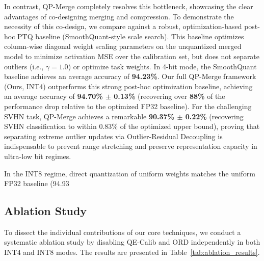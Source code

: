 In contrast, QP-Merge completely resolves this bottleneck, showcasing the clear advantages of co-designing merging and compression. To demonstrate the necessity of this co-design, we compare against a robust, optimization-based post-hoc PTQ baseline (SmoothQuant-style scale search). This baseline optimizes column-wise diagonal weight scaling parameters on the unquantized merged model to minimize activation MSE over the calibration set, but does not separate outliers (i.e., $\gamma = 1.0$) or optimize task weights. In 4-bit mode, the SmoothQuant baseline achieves an average accuracy of \textbf{94.23\%}. Our full QP-Merge framework (Ours, INT4) outperforms this strong post-hoc optimization baseline, achieving an average accuracy of \textbf{94.70\% $\pm$ 0.13\%} (recovering over \textbf{88\%} of the performance drop relative to the optimized FP32 baseline). For the challenging SVHN task, QP-Merge achieves a remarkable \textbf{90.37\% $\pm$ 0.22\%} (recovering SVHN classification to within 0.83\% of the optimized upper bound), proving that separating extreme outlier updates via Outlier-Residual Decoupling is indispensable to prevent range stretching and preserve representation capacity in ultra-low bit regimes.

In the INT8 regime, direct quantization of uniform weights matches the uniform FP32 baseline (94.93%

\subsection{Ablation Study}
To dissect the individual contributions of our core techniques, we conduct a systematic ablation study by disabling QE-Calib and ORD independently in both INT4 and INT8 modes. The results are presented in Table~\ref{tab:ablation_results}.

